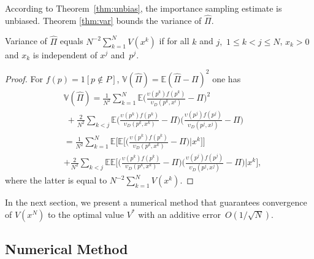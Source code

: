 According to Theorem~\ref{thm:unbias}, the importance sampling estimate is unbiased. Theorem \ref{thm:var} bounds the variance of $\hat\Pi$. 

\begin{theorem}\label{thm:var}
Variance of $\hat\Pi$ equals $N^{-2}\sum_{k=1}^N V(x^k)$ if for all $k$ and $j,$ $1\le k < j \le N$, $x_k > 0$ and $x_k$ is independent of $x^j$ and~$p^j$.
\end{theorem}
\begin{proof} For $f(p) = 1[p\not\in P]$, $\mathbb{V} (\hat\Pi)\!=\! \mathbb{E}(\hat\Pi - \Pi)^2$ one has 
\begin{align*}
    &\mathbb{V}(\hat\Pi) = \frac{1}{N^2} \sum_{k=1}^N \mathbb{E}\biggl( \frac{\upsilon(p^k)f(p^k)}{\upsilon_D(p^k, x^i)} - \Pi\biggr)^2
    \\ & 
    \; + \frac{2}{N^2}\sum_{k < j} \mathbb{E} \biggl(\frac{\upsilon(p^k)f(p^k)}{\upsilon_D(p^k, x^k)} - \Pi\biggr)\biggl(\frac{\upsilon(p^j)f(p^j)}{\upsilon_D(p^j, x^j)} - \Pi\biggr)\\
    & = \frac{1}{N^2}\sum_{k=1}^N \mathbb{E}\biggl[\mathbb{E}\biggl[\biggl(\frac{\upsilon(p^k)f(p^k)}{\upsilon_D(p^k,x^k)} - \Pi\biggr)\big| x^k\biggr]\biggr] \\
        & + \frac{2}{N^2}\sum_{k < j} \mathbb{E}\mathbb{E}\biggl[ \biggl(\frac{\upsilon(p^k)f(p^k)}{\upsilon_D(p^k, x^k)} - \Pi\biggr)\!\!\biggl(\frac{\upsilon(p^j)f(p^j)}{\upsilon_D(p^j, x^j)} - \Pi\biggr)\big|x^k\biggr],
\end{align*}
where the latter is equal to $N^{-2}\sum_{k=1}^N V(x^k)$.
\end{proof}

In the next section, we present a numerical method that guarantees convergence of $V(x^N)$ to the optimal value $V^*$ with an additive error~$O(1/\sqrt{N})$.

\subsection{Numerical Method}\label{sampling:nm}

